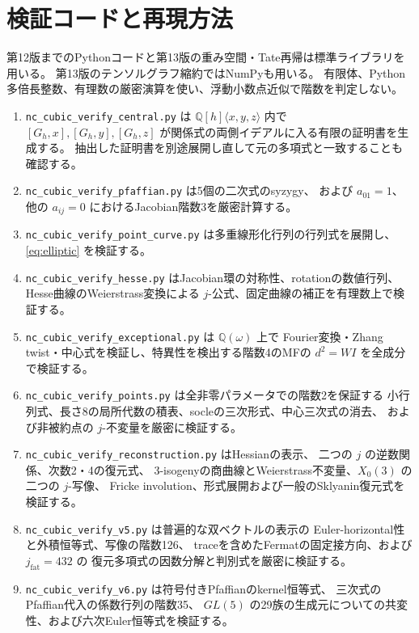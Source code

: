 \documentclass[a4paper,11pt]{ltjsarticle}
\theoremstyle{definition}
\begin{document}
\clearpage
\appendix
\section{検証コードと再現方法}

第12版までのPythonコードと第13版の重み空間・Tate再帰は標準ライブラリを用いる。
第13版のテンソルグラフ縮約ではNumPyも用いる。
有限体、Python多倍長整数、有理数の厳密演算を使い、浮動小数点近似で階数を判定しない。

\begin{enumerate}
 \item \texttt{nc\_cubic\_verify\_central.py} は $\mathbb Q[h]\langle x,y,z\rangle$ 内で
 $[G_h,x],[G_h,y],[G_h,z]$ が関係式の両側イデアルに入る有限の証明書を生成する。
 抽出した証明書を別途展開し直して元の多項式と一致することも確認する。
 \item \texttt{nc\_cubic\_verify\_pfaffian.py} は5個の二次式のsyzygy、
 および $a_{01}=1$、他の $a_{ij}=0$ におけるJacobian階数3を厳密計算する。
 \item \texttt{nc\_cubic\_verify\_point\_curve.py} は多重線形化行列の行列式を展開し、
 \eqref{eq:elliptic} を検証する。
 \item \texttt{nc\_cubic\_verify\_hesse.py} はJacobian環の対称性、rotationの数値行列、
 Hesse曲線のWeierstrass変換による $j$-公式、固定曲線の補正を有理数上で検証する。
 \item \texttt{nc\_cubic\_verify\_exceptional.py} は $\mathbb Q(\omega)$ 上で
 Fourier変換・Zhang twist・中心式を検証し、特異性を検出する階数4のMFの
 $d^2=W I$ を全成分で検証する。
 \item \texttt{nc\_cubic\_verify\_points.py} は全非零パラメータでの階数2を保証する
 小行列式、長さ8の局所代数の積表、socleの三次形式、中心三次式の消去、
 および非被約点の $j$-不変量を厳密に検証する。
 \item \texttt{nc\_cubic\_verify\_reconstruction.py} はHessianの表示、
 二つの $j$ の逆数関係、次数2・4の復元式、
 3-isogenyの商曲線とWeierstrass不変量、$X_0(3)$ の二つの $j$-写像、
 Fricke involution、形式展開および一般のSklyanin復元式を検証する。
 \item \texttt{nc\_cubic\_verify\_v5.py} は普遍的な双ベクトルの表示の
 Euler-horizontal性と外積恒等式、写像の階数126、
 traceを含めたFermatの固定接方向、および $j_{\mathrm{fat}}=432$ の
 復元多項式の因数分解と判別式を厳密に検証する。
 \item \texttt{nc\_cubic\_verify\_v6.py} は符号付きPfaffianのkernel恒等式、
 三次式のPfaffian代入の係数行列の階数35、
 $GL(5)$ の29族の生成元についての共変性、および六次Euler恒等式を検証する。

\end{enumerate}
\end{document}
